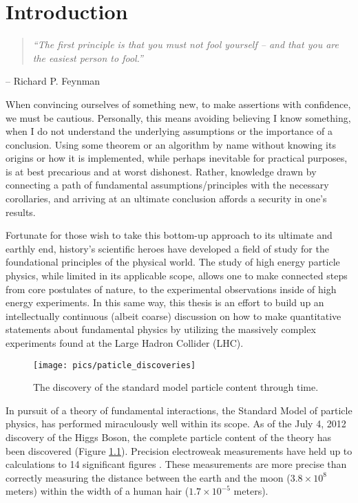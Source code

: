 \chapter{Introduction\label{ch:intro}}
\begin{quote}
\textit{``The first principle is that you must not fool yourself -- and that you are the easiest person to fool.''}
\end{quote}
\begin{center}-- Richard P. Feynman  \end{center}
When convincing ourselves of something new, to make assertions with confidence, we must
be cautious. Personally, this means avoiding believing I know something, when  
I do not understand the underlying assumptions or the importance  of a conclusion.
Using some theorem or an algorithm by name without knowing its origins or how
it is implemented, while perhaps inevitable for practical purposes, is at best precarious and at worst dishonest.
Rather, knowledge drawn by connecting a path of fundamental assumptions/principles
with the necessary corollaries, and arriving at an ultimate conclusion
affords a security in one's results. 

Fortunate for those wish to take this bottom-up approach to its ultimate and earthly end, history's 
scientific heroes have developed a field of study for the foundational principles of the physical world. 
The study of high energy particle physics,  while limited in its applicable scope, 
 allows one to make connected steps from core postulates of nature, to the experimental observations
 inside of high energy experiments. 
In this same way, this thesis is an effort to build up an intellectually continuous (albeit coarse)
discussion on how to make quantitative statements about fundamental physics by
utilizing the massively complex experiments found at the Large Hadron Collider (LHC). 

\begin{figure}
\begin{center}
\texttt{[image: pics/paticle\_discoveries]}
\end{center}
\caption{The discovery of the standard model particle content through time. \cite{tuna}}
\label{fig:particle_discoveries}
\end{figure}

In pursuit of a theory of fundamental interactions, the Standard Model of particle physics,
has performed miraculously well within its scope. 
As of the July 4, 2012 discovery of the Higgs Boson, the complete particle
content of the theory has been discovered (Figure \ref{fig:particle_discoveries}). Precision electroweak 
measurements have held up to calculations to 14 significant figures \cite{gminus2}. These measurements are
more precise than correctly measuring the distance between the earth and the moon ($3.8\times10^8$ meters) 
within the width of a human hair ($1.7\times 10^{-5}$ meters). 

